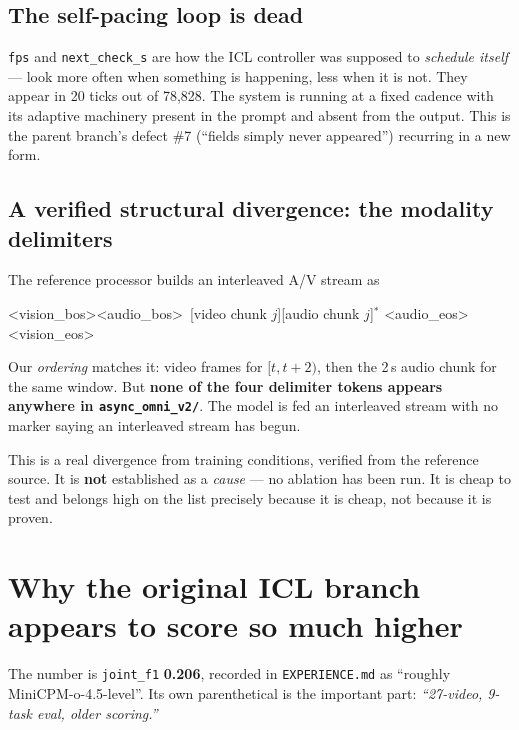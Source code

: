 \documentclass[11pt,a4paper]{article}
\begin{document}
\subsection{The self-pacing loop is dead}

\texttt{fps} and \texttt{next\_check\_s} are how the ICL controller was supposed to
\emph{schedule itself} --- look more often when something is happening, less when it is
not. They appear in 20 ticks out of 78{,}828. The system is running at a fixed cadence with
its adaptive machinery present in the prompt and absent from the output. This is the parent
branch's defect \#7 (``fields simply never appeared'') recurring in a new form.

\subsection{A verified structural divergence: the modality delimiters}

The reference processor builds an interleaved A/V stream as

\begin{center}\small\ttfamily
\textless vision\_bos\textgreater\textless audio\_bos\textgreater\ [video chunk $j$][audio
chunk $j$]$^{*}$ \textless audio\_eos\textgreater\textless vision\_eos\textgreater
\end{center}

\noindent Our \emph{ordering} matches it: video frames for $[t,t{+}2)$, then the 2\,s audio
chunk for the same window. But \textbf{none of the four delimiter tokens appears anywhere in
\texttt{async\_omni\_v2/}}. The model is fed an interleaved stream with no marker saying an
interleaved stream has begun.

This is a real divergence from training conditions, verified from the reference source. It
is \textbf{not} established as a \emph{cause} --- no ablation has been run. It is cheap to
test and belongs high on the list precisely because it is cheap, not because it is proven.

\section{Why the original ICL branch appears to score so much higher}

The number is \texttt{joint\_f1} \textbf{0.206}, recorded in \texttt{EXPERIENCE.md} as
``roughly MiniCPM-o-4.5-level''. Its own parenthetical is the important part:
\emph{``27-video, 9-task eval, older scoring.''}
\end{document}
